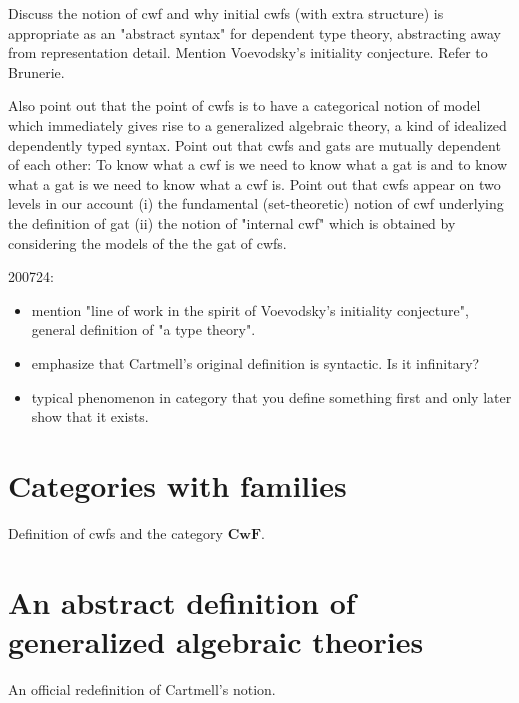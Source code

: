 \documentclass{lmcs}
\def\Cwf{\mathbf{CwF}}
\begin{document}
Discuss the notion of cwf and why initial cwfs (with extra structure) is appropriate as an "abstract syntax" for dependent type theory, abstracting away from representation detail. Mention Voevodsky's initiality conjecture. Refer to Brunerie.

Also point out that the point of cwfs is to have a categorical notion of model which immediately gives rise to a generalized algebraic theory, a kind of idealized dependently typed syntax. Point out that cwfs and gats are mutually dependent of each other: To know what a cwf is we need to know what a gat is and to know what a gat is we need to know what a cwf is. Point out that cwfs appear on two levels in our account (i) the fundamental (set-theoretic) notion of cwf underlying the definition of gat (ii) the notion of "internal cwf" which is obtained by considering the models of the the gat of cwfs.

200724: 
\begin{itemize}
\item mention "line of work in the spirit of Voevodsky's initiality conjecture", general definition of "a type theory".
\item emphasize that Cartmell's original definition is syntactic. Is it infinitary?
\item typical phenomenon in category that you define something first and only later show that it exists.
\end{itemize}

\section{Categories with families}

Definition of cwfs and the category $\Cwf$.

\section{An abstract definition of generalized algebraic theories}

An official redefinition of Cartmell's notion. 
\end{document}
